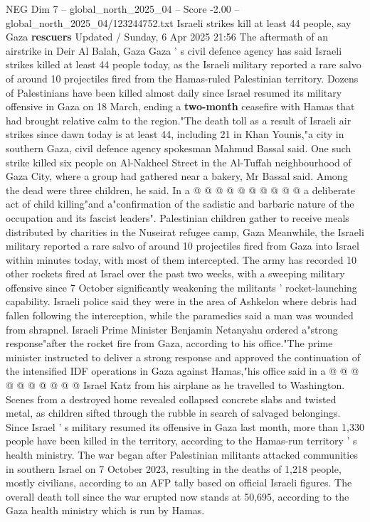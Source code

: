 \begin{textsample}{NEG Dim 7 – global\_north\_2025\_04 – Score -2.00 – global\_north\_2025\_04/123244752.txt}  \label{ex:f7_neg_090}
Israeli strikes kill at least 44 people, say Gaza \textbf{rescuers} Updated / Sunday, 6 Apr 2025 21:56 The aftermath of an airstrike in Deir Al Balah, Gaza Gaza ' s civil defence agency has said Israeli strikes killed at least 44 people today, as the Israeli military reported a rare salvo of around 10 projectiles fired from the Hamas-ruled Palestinian territory.
Dozens of Palestinians have been killed almost daily since Israel resumed its military offensive in Gaza on 18 March, ending a \textbf{two-month} ceasefire with Hamas that had brought relative calm to the region."The death toll as a result of Israeli air strikes since dawn today is at least 44, including 21 in Khan Younis,"a city in southern Gaza, civil defence agency spokesman Mahmud Bassal said.
One such strike killed six people on Al-Nakheel Street in the Al-Tuffah neighbourhood of Gaza City, where a group had gathered near a bakery, Mr Bassal said.
Among the dead were three children, he said.
In a @ @ @ @ @ @ @ @ @ @ a deliberate act of child killing"and a"confirmation of the sadistic and barbaric nature of the occupation and its fascist leaders".
Palestinian children gather to receive meals distributed by charities in the Nuseirat refugee camp, Gaza Meanwhile, the Israeli military reported a rare salvo of around 10 projectiles fired from Gaza into Israel within minutes today, with most of them intercepted.
The army has recorded 10 other rockets fired at Israel over the past two weeks, with a sweeping military offensive since 7 October significantly weakening the militants ' rocket-launching capability.
Israeli police said they were in the area of Ashkelon where debris had fallen following the interception, while the paramedics said a man was wounded from shrapnel.
Israeli Prime Minister Benjamin Netanyahu ordered a"strong response"after the rocket fire from Gaza, according to his office."The prime minister instructed to deliver a strong response and approved the continuation of the intensified IDF operations in Gaza against Hamas,"his office said in a @ @ @ @ @ @ @ @ @ @ Israel Katz from his airplane as he travelled to Washington.
Scenes from a destroyed home revealed collapsed concrete slabs and twisted metal, as children sifted through the rubble in search of salvaged belongings.
Since Israel ' s military resumed its offensive in Gaza last month, more than 1,330 people have been killed in the territory, according to the Hamas-run territory ' s health ministry.
The war began after Palestinian militants attacked communities in southern Israel on 7 October 2023, resulting in the deaths of 1,218 people, mostly civilians, according to an AFP tally based on official Israeli figures.
The overall death toll since the war erupted now stands at 50,695, according to the Gaza health ministry which is run by Hamas.

\end{textsample}
